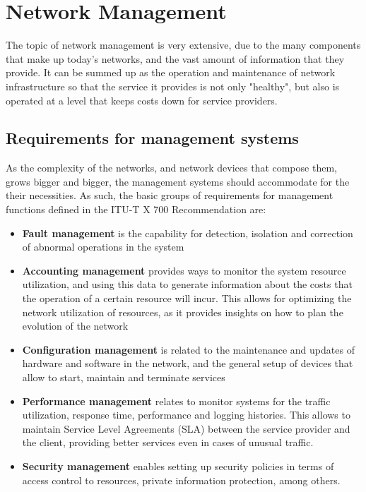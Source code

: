 \section{Network Management} \label{chap:nm} 

\par The topic of network management is very extensive, due to the many components that make up today's networks, and the vast amount of information that they
provide. It can be summed up as the operation and maintenance of network infrastructure so that the service it provides is not only "healthy", but also is operated
at a level that keeps costs down for service providers. 

\subsection {Requirements for management systems}

\par As the complexity of the networks, and network devices that compose them, grows bigger and bigger, the management systems should accommodate for the their
necessities. As such, the basic groups of requirements for management functions defined in the ITU-T X 700 Recommendation \cite{noauthor_recommendation_1992}
are:

\begin {itemize}
    \item \textbf {Fault management} is the capability for detection, isolation and correction of abnormal operations in the system
    \item \textbf {Accounting management} provides ways to monitor the system resource utilization, and using this data to generate information about the costs that
        the operation of a certain resource will incur. This allows for optimizing the network utilization of resources, as it provides insights on how to
        plan the evolution of the network
    \item \textbf {Configuration management} is related to the maintenance and updates of hardware and software in the network, and the general setup of devices 
        that allow to start, maintain and terminate services 
    \item \textbf {Performance management} relates to monitor systems for the traffic utilization, response time, performance and logging histories. This allows to 
        maintain Service Level Agreements (SLA) between the service provider and the client, providing better services even in cases of unusual traffic.
    \item \textbf {Security management} enables setting up security policies in terms of access control to resources, private information protection, among others.
\end {itemize}


